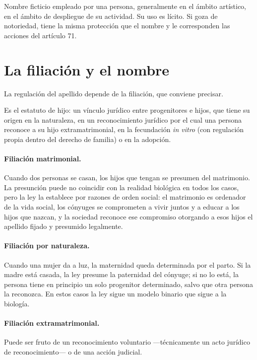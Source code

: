 \documentclass[12pt,oneside]{book}
\begin{document}
\begin{definicion}[Seudónimo]
Nombre ficticio empleado por una persona, generalmente en el ámbito artístico, en el ámbito de despliegue de su actividad. Su uso es lícito. Si goza de notoriedad, tiene la misma protección que el nombre y le corresponden las acciones del artículo 71.
\end{definicion}

\section{La filiación y el nombre}
\label{sec:filiacion}

La regulación del apellido depende de la filiación, que conviene precisar.

\begin{definicion}[Filiación]
Es el estatuto de hijo: un vínculo jurídico entre progenitores e hijos, que tiene su origen en la naturaleza, en un reconocimiento jurídico por el cual una persona reconoce a su hijo extramatrimonial, en la fecundación \textit{in vitro} (con regulación propia dentro del derecho de familia) o en la adopción.
\end{definicion}

\paragraph{Filiación matrimonial.} Cuando dos personas se casan, los hijos que tengan se presumen del matrimonio. La presunción puede no coincidir con la realidad biológica en todos los casos, pero la ley la establece por razones de orden social: el matrimonio es ordenador de la vida social, los cónyuges se comprometen a vivir juntos y a educar a los hijos que nazcan, y la sociedad reconoce ese compromiso otorgando a esos hijos el apellido fijado y presumido legalmente.

\paragraph{Filiación por naturaleza.} Cuando una mujer da a luz, la maternidad queda determinada por el parto. Si la madre está casada, la ley presume la paternidad del cónyuge; si no lo está, la persona tiene en principio un solo progenitor determinado, salvo que otra persona la reconozca. En estos casos la ley sigue un modelo binario que sigue a la biología.

\paragraph{Filiación extramatrimonial.} Puede ser fruto de un reconocimiento voluntario ---técnicamente un acto jurídico de reconocimiento--- o de una acción judicial.
\end{document}
